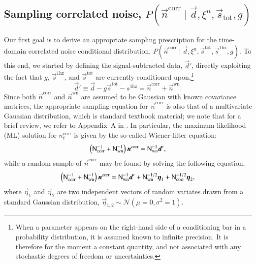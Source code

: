 \documentclass{aa}
\renewcommand{\d}[0]{\vec{d}}
\newcommand{\n}[0]{\vec{n}}
\newcommand{\s}[0]{\vec{s}}
\begin{document}
\subsection{Sampling correlated noise, $P(\vec{n}^\mathrm{corr}\mid\vec{d}, \xi^n, \vec{s}_\mathrm{tot}, g)$}
\label{sec:ncorr_samp}

Our first goal is to derive an appropriate sampling prescription for
the time-domain correlated noise conditional distribution,
${P(\vec{n}^\mathrm{corr}\mid\vec{d}, \xi^n, \vec{s}^\mathrm{tot}, \s^{\mathrm{1hz}},
  g)}$. To this end, we started by defining the signal-subtracted data,
$\vec{d}'$, directly exploiting the fact that $g$, $\s^{\mathrm{1hz}}$, and $\s^{\mathrm{tot}}$ are currently conditioned upon,\footnote{When a parameter appears on the right-hand side of a conditioning bar in a probability distribution, it is assumed known to infinite precision. It is therefore for the moment a constant quantity, and not associated with any stochastic degrees of freedom or uncertainties.}
\begin{equation}
 \d' \equiv \d - g \s^\mathrm{tot}  - s^{\mathrm{1hz}} = \n^\mathrm{corr} + \n^\mathrm{wn}. 
\end{equation}
Since both $\n^\mathrm{corr}$ and $\n^\mathrm{wn}$ are assumed
to be Gaussian with known covariance matrices, the appropriate sampling
equation for $\n^{\mathrm{corr}}$ is also that of a multivariate
Gaussian distribution, which is standard textbook material; we note that for a
brief review, we refer to Appendix~A in \citet{bp01}. In particular, the
maximum likelihood (ML) solution for $n_t^\mathrm{corr}$ is given by
the so-called Wiener-filter equation:
\begin{equation}\label{eq:ncorr}
 \left( \mathsf{N}_\mathrm{corr}^{-1} + \mathsf{N}_\mathrm{wn}^{-1}\right) \boldsymbol{n}^\mathrm{corr} = \mathsf{N}_\mathrm{wn}^{-1} \boldsymbol{d}', 
\end{equation}
while a random sample of $\vec{n}^\mathrm{corr}$ may be found by solving the following equation,
 \begin{equation}\label{eq:ncorr_samp}
 \left( \mathsf{N}_\mathrm{corr}^{-1} + \mathsf{N}_\mathrm{wn}^{-1}\right) \boldsymbol{n}^\mathrm{corr} = \mathsf{N}_\mathrm{wn}^{-1} \boldsymbol{d}' + \mathsf{N}_\mathrm{wn}^{-1 /2} \boldsymbol{\eta}_1 + \mathsf{N}_\mathrm{corr}^{- 1/2} \boldsymbol{\eta}_2,
 \end{equation}
where $\vec{\eta}_1$ and $\vec{\eta}_2$ are two independent vectors of
random variates drawn from a standard Gaussian distribution,
${\vec{\eta}_{1,2} \sim \mathcal{N}(\mu = 0, \sigma^2 = 1)}$.
\end{document}

